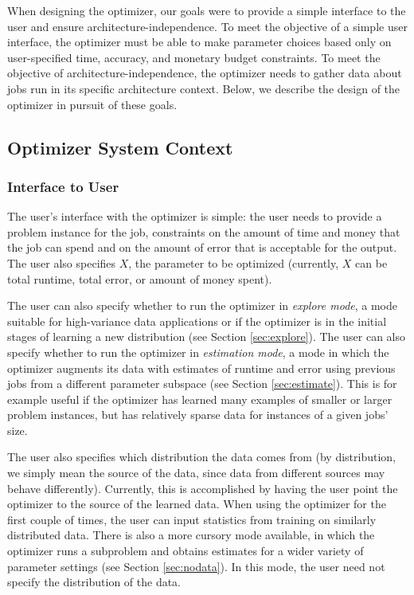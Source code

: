 
When designing the optimizer, our goals were to provide a simple 
interface to the user and ensure architecture-independence. To meet the
objective of a simple user interface, the optimizer must be able to
make parameter choices based only on user-specified time, accuracy, and
monetary budget constraints. To meet
the objective of architecture-independence, the optimizer needs to gather
data about jobs run in its specific architecture context. Below,
we describe the design of the optimizer in pursuit of these goals. 


\subsection{Optimizer System Context}


\subsubsection{Interface to User}
The user's interface with the optimizer is simple: the user needs to
provide a problem instance for the job, constraints on the amount of
time and money that the job can spend and on the amount of error
that is acceptable for the output. The user also specifies $X$, the 
parameter to be optimized (currently, $X$ can be total runtime, total
error, or amount of money spent).

The user can also specify whether to run the optimizer in {\em explore 
mode}, a mode suitable for high-variance data applications or if the 
optimizer is in the initial stages of learning a new 
distribution (see Section \ref{sec:explore}). The user can also specify
whether to run the optimizer in {\em estimation mode}, a mode in which
the optimizer augments its data with estimates of runtime and error 
using previous jobs from a different parameter 
subspace (see Section \ref{sec:estimate}). This is for example useful 
if the optimizer has learned many examples of
smaller or larger problem instances, but has relatively sparse data
for instances of a given jobs' size. 

The user also specifies which distribution the data comes from (by
distribution, we simply mean the source of the data, since data from
different sources may behave differently). Currently,
this is accomplished by having the user point the optimizer to the 
source of the learned data. When using the optimizer for the first 
couple of times, the user can input statistics from training on similarly
distributed data. There is also a more cursory mode available, in which
the optimizer runs a subproblem and obtains estimates for a wider 
variety of parameter settings (see Section \ref{sec:nodata}). In this 
mode, the user need not specify the distribution of the data. 

